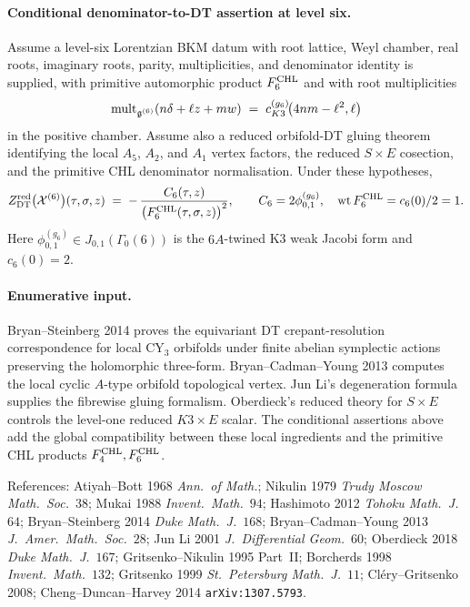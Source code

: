 \paragraph{Conditional denominator-to-DT assertion at level six.}
Assume a level-six Lorentzian BKM datum with root lattice, Weyl chamber,
real roots, imaginary roots, parity, multiplicities, and denominator
identity is supplied, with primitive automorphic product $F^{\mathrm{CHL}}_6$ and
with root multiplicities
\[
\mathrm{mult}_{\mathfrak{g}^{(6)}}(n\delta+\ell z+mw)
\;=\;c^{(g_6)}_{K3}\!\bigl(4nm-\ell^2,\ell\bigr)
\]
in the positive chamber. Assume also a reduced orbifold-DT gluing theorem
identifying the local $A_5$, $A_2$, and $A_1$ vertex factors, the reduced
$S\times E$ cosection, and the primitive CHL denominator normalisation.
Under these hypotheses,
\begin{equation}
Z^{\mathrm{red}}_{\mathrm{DT}}\bigl(\mathcal{X}^{(6)}\bigr)(\tau,\sigma,z)
\;=\;-\,\frac{C_6(\tau,z)}{\bigl(F^{\mathrm{CHL}}_{6}(\tau,\sigma,z)\bigr)^2},
\qquad
C_6=2\phi^{(g_6)}_{0,1},\quad
\mathrm{wt}\,F^{\mathrm{CHL}}_6=c_6(0)/2=1 .
\label{wn:eq:N6-DTred}
\end{equation}
Here $\phi^{(g_6)}_{0,1}\in J_{0,1}(\Gamma_0(6))$ is the $6A$-twined K3
weak Jacobi form and $c_6(0)=2$.

\paragraph{Enumerative input.}
Bryan--Steinberg 2014 proves the equivariant DT crepant-resolution
correspondence for local CY$_3$ orbifolds under finite abelian
symplectic actions preserving the holomorphic three-form.
Bryan--Cadman--Young 2013 computes the local cyclic $A$-type orbifold
topological vertex. Jun Li's degeneration formula supplies the
fibrewise gluing formalism. Oberdieck's reduced theory for $S\times E$
controls the level-one reduced $K3\times E$ scalar. The conditional
assertions above add the global compatibility between these local
ingredients and the primitive CHL products $F^{\mathrm{CHL}}_4,F^{\mathrm{CHL}}_6$.

References: Atiyah--Bott 1968 \emph{Ann.\ of Math.}; Nikulin 1979
\emph{Trudy Moscow Math.\ Soc.}~$38$; Mukai 1988
\emph{Invent.\ Math.}~$94$; Hashimoto 2012
\emph{Tohoku Math.\ J.}~$64$; Bryan--Steinberg 2014
\emph{Duke Math.\ J.}~$168$; Bryan--Cadman--Young 2013
\emph{J.\ Amer.\ Math.\ Soc.}~$28$; Jun Li 2001
\emph{J.\ Differential Geom.}~$60$; Oberdieck 2018
\emph{Duke Math.\ J.}~$167$; Gritsenko--Nikulin 1995 Part~II;
Borcherds 1998 \emph{Invent.\ Math.}~$132$; Gritsenko 1999
\emph{St.\ Petersburg Math.\ J.}~$11$; Cl\'ery--Gritsenko 2008;
Cheng--Duncan--Harvey 2014 \texttt{arXiv:1307.5793}.
